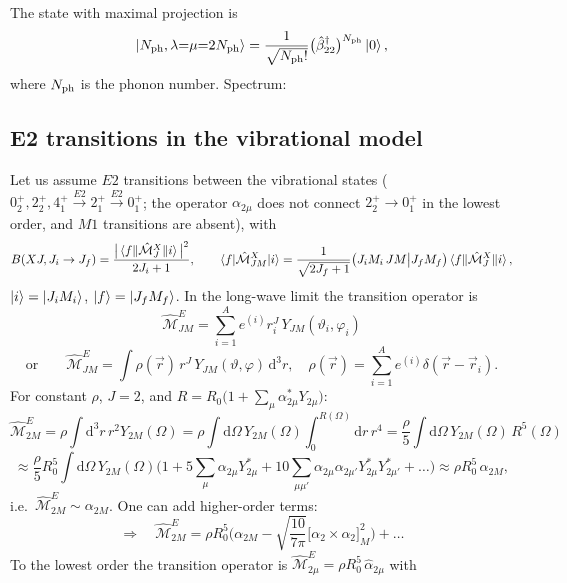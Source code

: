 \documentclass[11pt,a4paper]{article}
\newcommand{\op}[1]{\hat{#1}}
\newcommand{\ud}{\mathrm{d}}
\begin{document}
The state with maximal projection is
\[
\ket{N_{\rm ph},\lambda{=}\mu{=}2N_{\rm ph}}=\frac{1}{\sqrt{N_{\rm ph}!}}\big(\op\beta^\dagger_{22}\big)^{N_{\rm ph}}\ket0,
\]
where $N_{\rm ph}$ is the phonon number. Spectrum:
\begin{center}
\end{center}

\subsection{E2 transitions in the vibrational model}
Let us assume $E2$ transitions between the vibrational states ($0^+_2,2^+_2,4^+_1\xrightarrow{E2}2^+_1\xrightarrow{E2}0^+_1$; the operator $\alpha_{2\mu}$ does not connect $2^+_2\to0^+_1$ in the lowest order, and $M1$ transitions are absent), with
\[
B(XJ,J_i\to J_f)=\frac{\big|\braket{f\|\op{\mathcal M}^X_J\|i}\big|^2}{2J_i+1},\qquad
\braket{f|\op{\mathcal M}^X_{JM}|i}=\frac{1}{\sqrt{2J_f+1}}\big(J_iM_i\,JM\big|J_fM_f\big)\braket{f\|\op{\mathcal M}^X_J\|i},
\]
$\ket i=\ket{J_iM_i}$, $\ket f=\ket{J_fM_f}$. In the long-wave limit the transition operator is
\[
\op{\mathcal M}^E_{JM}=\sum_{i=1}^Ae^{(i)}r_i^J\,Y_{JM}(\vartheta_i,\varphi_i)
\]
\[
\text{or}\qquad\op{\mathcal M}^E_{JM}=\int\rho(\vec r)\,r^J\,Y_{JM}(\vartheta,\varphi)\,\ud^3r,\quad
\rho(\vec r)=\sum_{i=1}^Ae^{(i)}\delta(\vec r-\vec r_i).
\]
For constant $\rho$, $J=2$, and $R=R_0\big(1+\sum_\mu\alpha^*_{2\mu}Y_{2\mu}\big)$:
\[
\op{\mathcal M}^E_{2M}=\rho\int\ud^3r\,r^2Y_{2M}(\Omega)=\rho\int\ud\Omega\,Y_{2M}(\Omega)\int_0^{R(\Omega)}\ud r\,r^4
=\frac\rho5\int\ud\Omega\,Y_{2M}(\Omega)\,R^5(\Omega)
\]
\[
\approx\frac\rho5R_0^5\int\ud\Omega\,Y_{2M}(\Omega)\Big(1+5\sum_\mu\alpha_{2\mu}Y^*_{2\mu}+10\sum_{\mu\mu'}\alpha_{2\mu}\alpha_{2\mu'}Y^*_{2\mu}Y^*_{2\mu'}+\dots\Big)
\approx\rho R_0^5\,\alpha_{2M},
\]
i.e.\ $\op{\mathcal M}^E_{2M}\sim\alpha_{2M}$. One can add higher-order terms:
\[
\Rightarrow\quad \op{\mathcal M}^E_{2M}=\rho R_0^5\Big(\alpha_{2M}-\sqrt{\frac{10}{7\pi}}\big[\alpha_2\times\alpha_2\big]^2_M\Big)+\dots
\]
To the lowest order the transition operator is $\op{\mathcal M}^E_{2\mu}=\rho R_0^5\,\op\alpha_{2\mu}$ with
\end{document}
